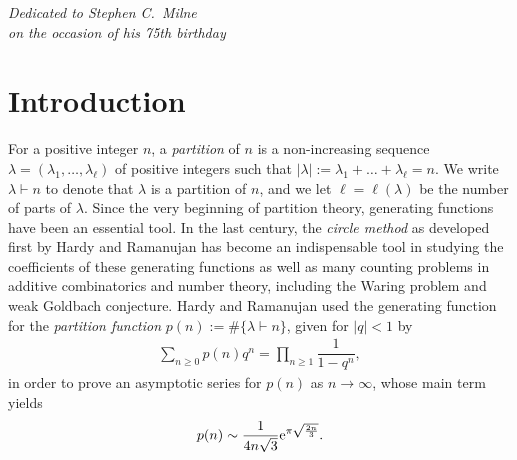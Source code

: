 \documentclass[pdftex]{sigma}
\numberwithin{equation}{section}
\def\lp{\left(}
\def\rp{\right)}
\begin{document}

\renewcommand{\thefootnote}{\arabic{footnote}}
\setcounter{footnote}{0}

\begin{flushright}
\begin{minipage}{58mm}
\it Dedicated to Stephen C.~Milne\\ on the occasion of his 75th birthday
\end{minipage}
\end{flushright}

\section{Introduction}

For a positive integer $n$, a {\it partition} of $n$ is a non-increasing sequence $\lambda = \lp \lambda_1, \dots, \lambda_\ell \rp$ of positive integers such that $|\lambda| := \lambda_1 + \dots + \lambda_\ell = n$. We write $\lambda \vdash n$ to denote that $\lambda$ is a partition of $n$, and we let $\ell = \ell\lp \lambda \rp$ be the number of parts of $\lambda$. Since the very beginning of partition theory, generating functions have been an essential tool. In the last century, the {\it circle method}
as developed first by Hardy and Ramanujan \cite{HR} has become an indispensable tool in studying the coefficients of these generating functions as well as many counting problems in additive combinatorics and number theory, including the Waring problem and weak Goldbach conjecture. Hardy and Ramanujan used the generating function for the {\it partition function} $p(n) := \#\{ \lambda \vdash n \}$, given for $|q|<1$ by
\begin{align*}
 \sum_{n \geq 0} p(n) q^n = \prod_{n \geq 1} \dfrac{1}{1 - q^n},
\end{align*}
in order to prove an asymptotic series for $p(n)$ as $n \to \infty$, whose main term yields
\begin{align*}
 p(n) \sim \dfrac{1}{4n\sqrt{3}} {\rm e}^{\pi\sqrt{\frac{2n}{3}}}.
\end{align*}
\end{document}
